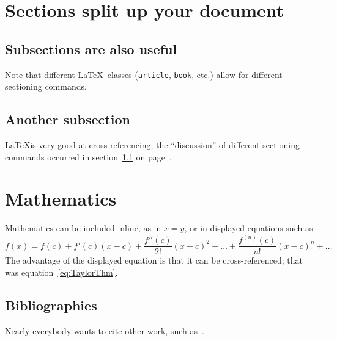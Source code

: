 \documentclass[a4paper]{article}
\begin{document}
\section{Sections split up your document}
\label{sec:TopSection}


\subsection{Subsections are also useful}
\label{sec:SubSection}

Note that different \LaTeX\ classes (\texttt{article}, \texttt{book},
etc.) allow for different sectioning commands.


\subsection{Another subsection}
\label{sec:SubSection2}

\LaTeX is very good at cross-referencing; the ``discussion'' of
different sectioning commands occurred in section~\ref{sec:SubSection}
on page~\pageref{sec:SubSection}.


\section{Mathematics}
\label{sec:Maths}

Mathematics can be included inline, as in $x = y$, or in displayed
equations such as
%
\begin{equation}
  \label{eq:TaylorThm}
  f(x) = f(c) + f'(c) (x - c) + \frac{f''(c)}{2!} (x - c)^2 + \ldots +
  \frac{f^{(n)}(c)}{n!} (x - c)^n + \ldots
\end{equation}
%
The advantage of the displayed equation is that it can be
cross-referenced; that was equation~\ref{eq:TaylorThm}.

\subsection{Bibliographies}
\label{sec:BibTeX}


Nearly everybody wants to cite other work, such as~\cite{godunov}.



\end{document}
